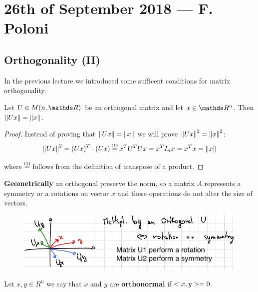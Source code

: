 \documentclass[computationalMathematics.tex]{subfiles}
\begin{document}
\section{26th of September 2018 --- F. Poloni}

\subsection{Orthogonality (II)}
In the previous lecture we introduced some sufficent conditions for matrix orthogonality.

\begin{theorem}
  Let $U \in M(n, \R)$ be an orthogonal matrix and let $x \in \R^n$. Then $\left\lVert Ux\right\rVert = \left\lVert x\right\rVert$.
\end{theorem}

\begin{proof}
  Instead of proving that $\left\lVert Ux\right\rVert = \left\lVert x\right\rVert$ we will prove $\left\lVert Ux\right\rVert^2 = \left\lVert x\right\rVert^2$:\\
  
  \[
    \norm{Ux}^2 = \tr{(Ux)} \cdot (Ux) \numeq{(1)} \tr{x} \tr{U} U x = \tr{x} I_n x = \tr{x} x = \norm{x}
  \]

  where $\numeq{(1)}$ follows from the definition of transpose of a product.
\end{proof}

\textbf{Geometrically} an orthogonal preserve the norm, so a matrix $A$ represents a symmetry or a rotations on vector $x$ and these operations do not alter the size of vectors.

\begin{figure}[H]
    \centering
    \includegraphics[scale = 0.5]{pics/26sett/orthgonal.png}
\end{figure}

\begin{definition}[Orthogonality]
  Let $x, y \in R^n$ we say that $x$ and $y$ are \textbf{orthonormal} if $<x, y> = 0$.
\end{definition}
\end{document}
